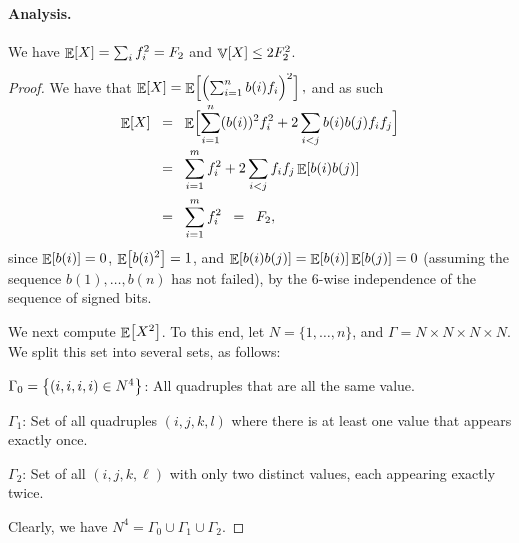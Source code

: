 \paragraph*{Analysis.}
\begin{lemma}
    We have $\mathop{\mathbb{E}}\!\left[ {X} \right] = \sum_i f_i^2 = F_2$ and
    $\mathop{\mathbb{V}}\!\left[ {X} \right] \leq 2 F_2^2$.
\end{lemma}
\begin{proof}
    We have that
    \begin{math}
        \Ex{X}
        =
        \Ex{\smash{ \Bigl(  \sum_{i=1}^n b(i) \frq_i \Bigr)^2}
           \Bigr.},%
    \end{math}
    and as such
    \begin{align*}
        \Ex{X}%
        &\EQ%
        \Ex{\Bigr. \smash{  \sum_{i=1}^n (b(i))^2 \frq_i^2 %
              + 2\sum_{i < j} b(i) b(j) \frq_i \frq_j}}%
        \\[0.2cm]&
        \EQ%
        \sum_{i=1}^m  \frq_i^2 +  2\sum_{i < j}  \frq_i \frq_j \Ex{   %
           b(i) b(j)}%
        \\&
        \EQ%
        \sum_{i=1}^m  \frq_i^2
        \EQ%
        \Frq_2,
    \end{align*}
    since $\mathop{\mathbb{E}}\!\left[ {b(i)} \right] = 0$, $\mathop{\mathbb{E}}\!\left[ {b(i)^2} \right] =1$, and
    $\mathop{\mathbb{E}}\!\left[ {b(i)b(j) } \right] = \mathop{\mathbb{E}}\!\left[ {b(i) } \right] \mathop{\mathbb{E}}\!\left[ {b(j)} \right] = 0$ (assuming the sequence
    $b(1), \ldots, b(n)$ has not failed), by the $6$-wise independence
    of the sequence of signed bits.

    \medskip%
    We next compute $\mathop{\mathbb{E}}\!\left[ {X^2} \right]$. To this end, let
    $N = \{1,\ldots, n\}$, and $\Gamma = N\times N \times N \times
    N$. We split this set into several sets, as follows:
    \begin{compactenumi}
        \smallskip%
        \item $\Gamma_0 = \left\{ {(i,i,i,i) \in N^4} \right\}$: All quadruples
        that are all the same value.

        \smallskip%
        \item $\Gamma_{1}$: Set of all quadruples $(i,j,k,l)$ where
        there is at least one value that appears exactly once.


        \smallskip%
        \item $\Gamma_{2}$: Set of all $(i,j,k,\ell)$ with only two
        distinct values, each appearing exactly twice.
    \end{compactenumi}
    \smallskip%
    Clearly, we have $N^4 = \Gamma_0 \cup \Gamma_1 \cup \Gamma_2$.

    \smallskip


\end{proof}
